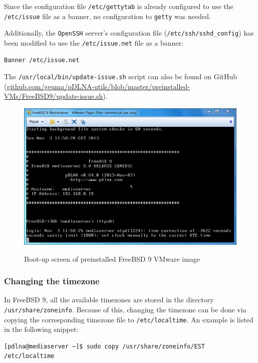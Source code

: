 \documentclass[a4paper,oneside,10pt]{report}
\newenvironment{colframefile}{%
  \begin{Sbox}
    \begin{minipage}{.99\columnwidth}
}{%
  \end{minipage}
  \end{Sbox}
  \begin{center}
    \fcolorbox{black}{Yellow}{\TheSbox}
  \end{center}
}
\begin{document}
Since the configuration file \verb|/etc/gettytab| is already configured to use the \verb|/etc/issue| file as a banner, no configuration to \verb|getty| was needed.

Additionally, the \verb|OpenSSH| server's configuration file (\verb|/etc/ssh/sshd_config|) has been modified to use the \verb|/etc/issue.net| file as a banner:
\begin{colframefile}
\begin{verbatim}
Banner /etc/issue.net
\end{verbatim}
\end{colframefile}

The \verb|/usr/local/bin/update-issue.sh| script can also be found on GitHub (\url{github.com/geuma/pDLNA-utils/blob/master/preinstalled-VMs/FreeBSD9/update-issue.sh}).

\begin{figure}
	\centering
		\includegraphics[width=34em]{images/vm_freebsd9_loginscreen}
	\label{fig:freebsd9-loginscreen}
	\caption{Boot-up screen of preinstalled FreeBSD 9 VMware image}
\end{figure}

\subsubsection{Changing the timezone}

In FreeBSD 9, all the available timezones are stored in the directory \verb|/usr/share/zoneinfo|. Because of this, changing the timezone can be done via copying the corresponding timezone file to \verb|/etc/localtime|. An example is listed in the following snippet:

\begin{lstlisting}
[pdlna@mediaserver ~]$ sudo copy /usr/share/zoneinfo/EST /etc/localtime
\end{lstlisting}
\end{document}
